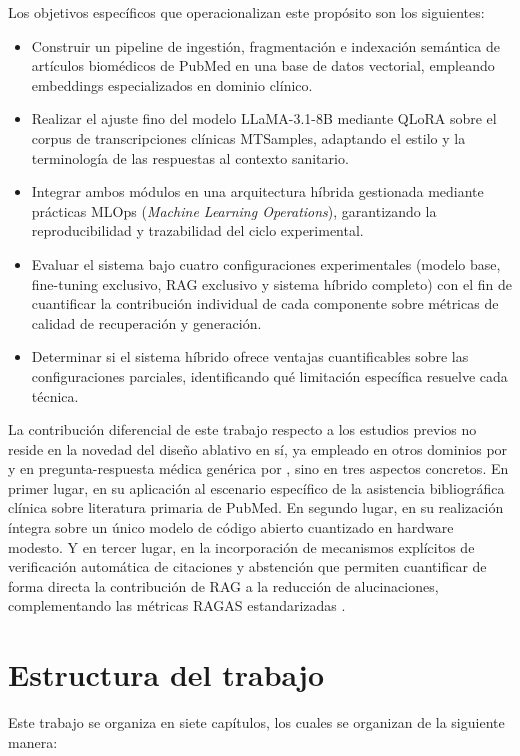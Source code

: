 \documentclass[11pt,a4paper,spanish]{book}
\numberwithin{equation}{chapter}
\numberwithin{figure}{chapter}
\begin{document}
Los objetivos específicos que operacionalizan este propósito son los siguientes:
\begin{itemize}
	\item Construir un pipeline de ingestión, fragmentación e indexación semántica de artículos biomédicos de PubMed en una base de datos vectorial, empleando embeddings especializados en dominio clínico.
	\item Realizar el ajuste fino del modelo LLaMA-3.1-8B mediante QLoRA sobre el corpus de transcripciones clínicas MTSamples, adaptando el estilo y la terminología de las respuestas al contexto sanitario.
	\item Integrar ambos módulos en una arquitectura híbrida gestionada mediante prácticas MLOps (\textit{Machine Learning Operations}), garantizando la reproducibilidad y trazabilidad del ciclo experimental.
	\item Evaluar el sistema bajo cuatro configuraciones experimentales (modelo base, fine-tuning exclusivo, RAG exclusivo y sistema híbrido completo) con el fin de cuantificar la contribución individual de cada componente sobre métricas de calidad de recuperación y generación.
	\item Determinar si el sistema híbrido ofrece ventajas cuantificables sobre las configuraciones parciales, identificando qué limitación específica resuelve cada técnica.
\end{itemize}

La contribución diferencial de este trabajo respecto a los estudios previos no reside en la novedad del diseño ablativo en sí, ya empleado en otros dominios por \cite{balaguer2024ragvsfinetuningpipelines} y en pregunta-respuesta médica genérica por \cite{pingua_medical_FT_vs_RAG_2025}, sino en tres aspectos concretos. En primer lugar, en su aplicación al escenario específico de la asistencia bibliográfica clínica sobre literatura primaria de PubMed. En segundo lugar, en su realización íntegra sobre un único modelo de código abierto cuantizado en hardware modesto. Y en tercer lugar, en la incorporación de mecanismos explícitos de verificación automática de citaciones y abstención que permiten cuantificar de forma directa la contribución de RAG a la reducción de alucinaciones, complementando las métricas RAGAS estandarizadas \cite{es2025ragasautomatedevaluationretrieval}.

\section{Estructura del trabajo}
Este trabajo se organiza en siete capítulos, los cuales se organizan de la siguiente manera:
\end{document}
